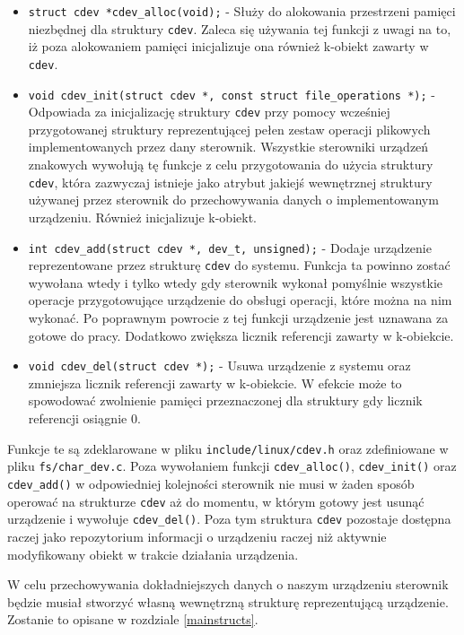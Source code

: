 \documentclass[10pt]{article}
\begin{document}
\begin{itemize}
\item
  \texttt{struct cdev *cdev\_alloc(void);} - Służy do alokowania
  przestrzeni pamięci niezbędnej dla struktury \texttt{cdev}. Zaleca się
  używania tej funkcji z uwagi na to, iż poza alokowaniem pamięci
  inicjalizuje ona również k-obiekt zawarty w \texttt{cdev}.
\item
  \texttt{void cdev\_init(struct cdev *, const struct file\_operations *);}
  - Odpowiada za inicjalizację struktury \texttt{cdev} przy pomocy
  wcześniej przygotowanej struktury reprezentującej pełen zestaw
  operacji plikowych implementowanych przez dany sterownik. Wszystkie
  sterowniki urządzeń znakowych wywołują tę funkcje z celu przygotowania
  do użycia struktury \texttt{cdev}, która zazwyczaj istnieje jako
  atrybut jakiejś wewnętrznej struktury używanej przez sterownik do
  przechowywania danych o implementowanym urządzeniu. Również
  inicjalizuje k-obiekt.
\item
  \texttt{int cdev\_add(struct cdev *, dev\_t, unsigned);} - Dodaje
  urządzenie reprezentowane przez strukturę \texttt{cdev} do systemu.
  Funkcja ta powinno zostać wywołana wtedy i tylko wtedy gdy sterownik
  wykonał pomyślnie wszystkie operacje przygotowujące urządzenie do
  obsługi operacji, które można na nim wykonać. Po poprawnym powrocie z
  tej funkcji urządzenie jest uznawana za gotowe do pracy. Dodatkowo
  zwiększa licznik referencji zawarty w k-obiekcie.
\item
  \texttt{void cdev\_del(struct cdev *);} - Usuwa urządzenie z systemu
  oraz zmniejsza licznik referencji zawarty w k-obiekcie. W efekcie może
  to spowodować zwolnienie pamięci przeznaczonej dla struktury gdy
  licznik referencji osiągnie 0.
\end{itemize}

Funkcje te są zdeklarowane w pliku \texttt{include/linux/cdev.h} oraz
zdefiniowane w pliku \texttt{fs/char\_dev.c}. Poza wywołaniem funkcji
\texttt{cdev\_alloc()}, \texttt{cdev\_init()} oraz \texttt{cdev\_add()}
w odpowiedniej kolejności sterownik nie musi w żaden sposób operować na
strukturze \texttt{cdev} aż do momentu, w którym gotowy jest usunąć
urządzenie i wywołuje \texttt{cdev\_del()}. Poza tym struktura
\texttt{cdev} pozostaje dostępna raczej jako repozytorium informacji o
urządzeniu raczej niż aktywnie modyfikowany obiekt w trakcie działania
urządzenia.

W celu przechowywania dokładniejszych danych o naszym urządzeniu
sterownik będzie musiał stworzyć własną wewnętrzną strukturę
reprezentującą urządzenie. Zostanie to opisane w rozdziale
\ref{mainstructs}.
\end{document}
